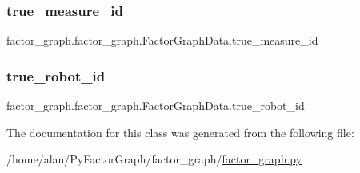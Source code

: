 \subsubsection{\texorpdfstring{true\+\_\+measure\+\_\+id}{true\_measure\_id}}
{\footnotesize\ttfamily factor\+\_\+graph.\+factor\+\_\+graph.\+Factor\+Graph\+Data.\+true\+\_\+measure\+\_\+id\hspace{0.3cm}{\ttfamily [static]}}

\mbox{\label{classfactor__graph_1_1factor__graph_1_1FactorGraphData_a44c11463c44ed3f4e2b94a5735b627fa}}
\subsubsection{\texorpdfstring{true\+\_\+robot\+\_\+id}{true\_robot\_id}}
{\footnotesize\ttfamily factor\+\_\+graph.\+factor\+\_\+graph.\+Factor\+Graph\+Data.\+true\+\_\+robot\+\_\+id\hspace{0.3cm}{\ttfamily [static]}}



The documentation for this class was generated from the following file\+:\begin{DoxyCompactItemize}
\item
/home/alan/\+Py\+Factor\+Graph/factor\+\_\+graph/\hyperlink{factor__graph_8py}{factor\+\_\+graph.\+py}\end{DoxyCompactItemize}
